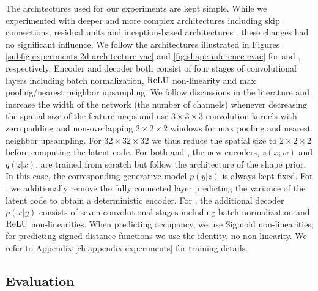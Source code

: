 The architectures used for our experiments are kept simple.
While we experimented with deeper and more complex architectures
including skip connections, residual units \cite{HeSun:2016} and
inception-based architectures \cite{SzegedyRabinovich:2015,SzegedyWojna:2016},
these changes had no significant influence.
We follow the architectures illustrated in Figures \ref{subfig:experiments-2d-architecture-vae}
and \ref{fig:shape-inference-evae} for \VAEs and \EVAEs, respectively.
Encoder and decoder both consist of four stages of convolutional
layers including batch normalization, $\operatorname{ReLU}$ non-linearity and max
pooling/nearest neighbor upsampling. We follow discussions
in the literature \cite{SzegedyWojna:2016}
and increase the width of the network (\ie the number of channels) whenever decreasing the
spatial size of the feature maps and use $3 \times 3 \times 3$ convolution kernels
with zero padding and non-overlapping $2 \times 2 \times 2$ windows for max pooling and
nearest neighbor upsampling. For $32 \times 32 \times 32$ we thus reduce the spatial
size to $2 \times 2 \times 2$ before computing the latent code.
For both \AML and \EVAE, the new encoders, \ie $z(x; w)$ and $q(z | x)$, are trained from
scratch but follow the architecture of the shape prior. In this case, the corresponding
generative model $p(y | z)$ is always kept fixed.
For \AML, we additionally remove the fully connected layer predicting
the variance of the latent code
to obtain a deterministic encoder. For \EVAE, the additional decoder $p(x | y)$
consists of seven convolutional stages including batch normalization and
$\operatorname{ReLU}$ non-linearities. When predicting occupancy, we use Sigmoid non-linearities;
for predicting signed distance functions we use the identity, \ie no non-linearity.
We refer to Appendix \ref{ch:appendix-experiments} for training details.

\subsection{Evaluation}
\label{sec:experiments-2d-evaluation}

